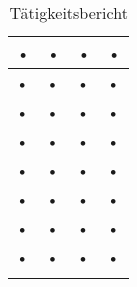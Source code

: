 \begin{longtable}{|p{}|p{}|p{}|p{}|}
	\hline 
	\rule[-1ex]{0pt}{2.5ex} • & • & • & • \\ 
	\hline 
	\rule[-1ex]{0pt}{2.5ex} • & • & • & • \\ 
	\hline 
	\rule[-1ex]{0pt}{2.5ex} • & • & • & • \\ 
	\hline 
	\rule[-1ex]{0pt}{2.5ex} • & • & • & • \\ 
	\hline 
	\rule[-1ex]{0pt}{2.5ex} • & • & • & • \\ 
	\hline 
	\rule[-1ex]{0pt}{2.5ex} • & • & • & • \\ 
	\hline 
	\rule[-1ex]{0pt}{2.5ex} • & • & • & • \\ 
	\hline 
	\rule[-1ex]{0pt}{2.5ex} • & • & • & • \\ 
	\hline 
	\caption{Tätigkeitsbericht \emplB} %
	\label{tab:taskTableEmplB}
	
\end{longtable} 